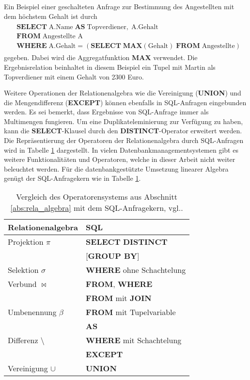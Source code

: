 Ein Beispiel einer geschalteten Anfrage zur Bestimmung des Angestellten mit dem höchstem Gehalt ist durch
\begin{align}
    \label{anf:schachtel}
    \begin{split}
        & \mathbf{SELECT} \; \text{A.Name}\;  \mathbf{AS} \; \text{Topverdiener},\; \text{A.Gehalt}\\
        & \mathbf{FROM} \; \text{Angestellte A} \\
        &\mathbf{WHERE} \; \text{A.Gehalt}=(\mathbf{SELECT}\; \mathbf{MAX}(\text{Gehalt}) \; \mathbf{FROM}\; \text{Angestellte})
    \end{split}
\end{align}
gegeben. Dabei wird die Aggregatfunktion \textbf{MAX} verwendet. Die Ergebnisrelation beinhaltet in diesem Beispiel ein Tupel mit Martin als Topverdiener mit einem Gehalt von 2300 Euro.

Weitere Operationen der Relationenalgebra wie die Vereinigung (\textbf{UNION}) und die Mengendifferenz (\textbf{EXCEPT}) können ebenfalls in SQL-Anfragen eingebunden werden. Es sei bemerkt, dass Ergebnisse von SQL-Anfrage immer als Multimengen fungieren. Um eine Duplikateleminierung zur Verfügung zu haben, kann die \textbf{SELECT}-Klausel durch den \textbf{DISTINCT}-Operator erweitert werden. Die Repräsentierung der Operatoren der Relationenalgebra durch SQL-Anfragen wird in Tabelle \ref{table:vgl} dargestellt. In vielen Datenbankmanagementsystemen gibt es weitere Funktionalitäten und Operatoren, welche in dieser Arbeit nicht weiter beleuchtet werden. Für die datenbankgestützte Umsetzung linearer Algebra genügt der SQL-Anfragekern wie in Tabelle \ref{table:vgl}.

\begin{table}[h]
    \centering
    \begin{tabular}{|l|l|} \hline
        Relationenalgebra &SQL \\ 
        \hline
        Projektion $\pi$ &\textbf{SELECT} \textbf{DISTINCT} \\ 
        &[\textbf{GROUP BY}] \\
        \hline
        Selektion $\sigma$ &\textbf{WHERE} ohne Schachtelung\\
        \hline
        Verbund $\bowtie$ &\textbf{FROM}, \textbf{WHERE}\\
        &\textbf{FROM} mit \textbf{JOIN} \\
        \hline
        Umbenennung $\beta$ &\textbf{FROM} mit Tupelvariable \\ &\textbf{AS} \\
        \hline
        Differenz $\setminus$ & \textbf{WHERE} mit Schachtelung \\
                  & \textbf{EXCEPT} \\
        \hline
        Vereinigung $\cup$ &\textbf{UNION}  \\
        \hline        
    \end{tabular}
    \caption[tt]{Vergleich des Operatorensystems aus Abschnitt \ref{abs:rela_algebra} mit dem SQL-Anfragekern, vgl.\cite{DBLP:books/daglib/0044627}.}
    \label{table:vgl}
\end{table}
